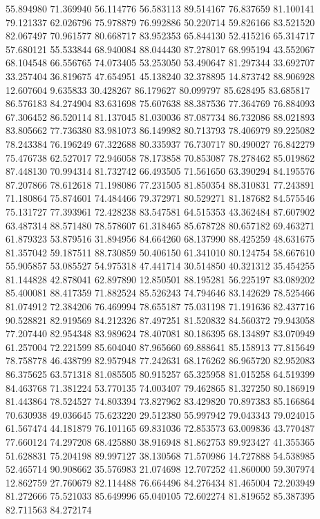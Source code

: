 55.894980
71.369940
56.114776
56.583113
89.514167
76.837659
81.100141
79.121337
62.026796
75.978879
76.992886
50.220714
59.826166
83.521520
82.067497
70.961577
80.668717
83.952353
65.844130
52.415216
65.314717
57.680121
55.533844
68.940084
88.044430
87.278017
68.995194
43.552067
68.104548
66.556765
74.073405
53.253050
53.490647
81.297344
33.692707
33.257404
36.819675
47.654951
45.138240
32.378895
14.873742
88.906928
12.607604
9.635833
30.428267
86.179627
80.099797
85.628495
83.685817
86.576183
84.274904
83.631698
75.607638
88.387536
77.364769
76.884093
67.306452
86.520114
81.137045
81.030036
87.087734
86.732086
88.021893
83.805662
77.736380
83.981073
86.149982
80.713793
78.406979
89.225082
78.243384
76.196249
67.322688
80.335937
76.730717
80.490027
76.842279
75.476738
62.527017
72.946058
78.173858
70.853087
78.278462
85.019862
87.448130
70.994314
81.732742
66.493505
71.561650
63.390294
84.195576
87.207866
78.612618
71.198086
77.231505
81.850354
88.310831
77.243891
71.180864
75.874601
74.484466
79.372971
80.529271
81.187682
84.575546
75.131727
77.393961
72.428238
83.547581
64.515353
43.362484
87.607902
63.487314
88.571480
78.578607
61.318465
85.678728
80.657182
69.463271
61.879323
53.879516
31.894956
84.664260
68.137990
88.425259
48.631675
81.357042
59.187511
88.730859
50.406150
61.341010
80.124754
58.667610
55.905857
53.085527
54.975318
47.441714
30.514850
40.321312
35.454255
81.144828
42.878041
62.897890
12.850501
88.195281
56.225197
83.089202
85.400081
88.417359
71.882524
85.526243
74.794646
83.142629
78.525466
81.074912
72.384206
76.469994
78.655187
75.031198
71.191636
82.437716
90.528821
82.919569
84.212326
87.497251
81.520832
84.560372
79.943058
77.207440
82.954348
83.989624
78.407081
80.186395
68.134897
83.070949
61.257004
72.221599
85.604040
87.965660
69.888641
85.158913
77.815649
78.758778
46.438799
82.957948
77.242631
68.176262
86.965720
82.952083
86.375625
63.571318
81.085505
80.915257
65.325958
81.015258
64.519399
84.463768
71.381224
53.770135
74.003407
79.462865
81.327250
80.186919
81.443864
78.524527
74.803394
73.827962
83.429820
70.897383
85.166864
70.630938
49.036645
75.623220
29.512380
55.997942
79.043343
79.024015
61.567474
44.181879
76.101165
69.831036
72.853573
63.009836
43.770487
77.660124
74.297208
68.425880
38.916948
81.862753
89.923427
41.355365
51.628831
75.204198
89.997127
38.130568
71.570986
14.727888
54.538985
52.465714
90.908662
35.576983
21.074698
12.707252
41.860000
59.307974
12.862759
27.760679
82.114488
76.664496
84.276434
81.465004
72.203949
81.272666
75.521033
85.649996
65.040105
72.602274
81.819652
85.387395
82.711563
84.272174
